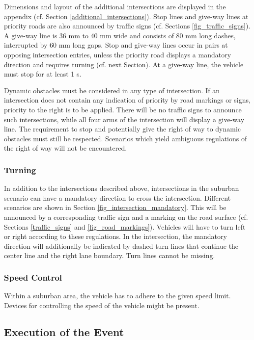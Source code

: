 \documentclass[a4paper]{report}
\begin{document}
Dimensions and layout of the additional intersections are displayed in the
appendix (cf. Section \ref{additional_intersections}). Stop lines and give-way
lines at priority roads are also announced by traffic signs (cf. Sections
\ref{fig_traffic_signs}). A give-way line is 36 mm to 40 mm wide and consists
of 80 mm long dashes, interrupted by 60 mm long gaps. Stop and give-way lines
occur in pairs at opposing intersection entries, unless the priority road
displays a mandatory direction and requires turning (cf. next Section). At a
give-way line, the vehicle must stop for at least 1 s.

Dynamic obstacles must be considered in any type of intersection. If an
intersection does not contain any indication of priority by road markings or
signs, priority to the right is to be applied. There will be no traffic signs
to announce such intersections, while all four arms of the intersection will
display a give-way line. The requirement to stop and potentially give the right
of way to dynamic obstacles must still be respected. Scenarios which yield
ambiguous regulations of the right of way will not be encountered.

\subsubsection{Turning}
\label{turning}

In addition to the intersections described above, intersections in the suburban
scenario can have a mandatory direction to cross the intersection. Different
scenarios are shown in Section \ref{fig_intersection_mandatory}. This will be
announced by a corresponding traffic sign and a marking on the road surface
(cf. Sections \ref{traffic_signs} and \ref{fig_road_markings}). Vehicles will
have to turn left or right according to these regulations. In the intersection,
the mandatory direction will additionally be indicated by dashed turn lines
that continue the center line and the right lane boundary. Turn lines cannot be
missing.

\subsubsection{Speed Control}

Within a suburban area, the vehicle has to adhere to the given speed limit.
Devices for controlling the speed of the vehicle might be present.

\subsection{Execution of the Event}
\end{document}
